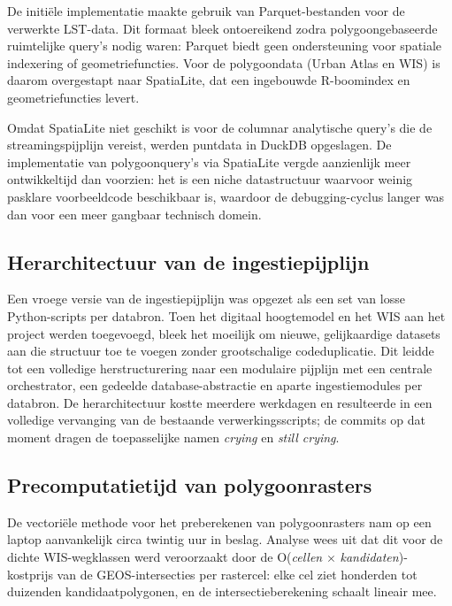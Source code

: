 De initiële implementatie maakte gebruik van Parquet-bestanden voor de verwerkte LST-data.
Dit formaat bleek ontoereikend zodra polygoongebaseerde ruimtelijke query's nodig waren: Parquet biedt geen ondersteuning voor spatiale indexering of geometriefuncties.
Voor de polygoondata (Urban Atlas en WIS) is daarom overgestapt naar SpatiaLite, dat een ingebouwde R-boomindex en geometriefuncties levert.

Omdat SpatiaLite niet geschikt is voor de columnar analytische query's die de streamingspijplijn vereist, werden puntdata in DuckDB opgeslagen.
De implementatie van polygoonquery's via SpatiaLite vergde aanzienlijk meer ontwikkeltijd dan voorzien: het is een niche datastructuur waarvoor weinig pasklare voorbeeldcode beschikbaar is, waardoor de debugging-cyclus langer was dan voor een meer gangbaar technisch domein.

\subsection{Herarchitectuur van de ingestiepijplijn}

Een vroege versie van de ingestiepijplijn was opgezet als een set van losse Python-scripts per databron.
Toen het digitaal hoogtemodel en het WIS aan het project werden toegevoegd, bleek het moeilijk om nieuwe, gelijkaardige datasets aan die structuur toe te voegen zonder grootschalige codeduplicatie.
Dit leidde tot een volledige herstructurering naar een modulaire pijplijn met een centrale orchestrator, een gedeelde database-abstractie en aparte ingestiemodules per databron.
De herarchitectuur kostte meerdere werkdagen en resulteerde in een volledige vervanging van de bestaande verwerkingsscripts; de commits op dat moment dragen de toepasselijke namen \textit{crying} en \textit{still crying}.

\subsection{Precomputatietijd van polygoonrasters}

De vectoriële methode voor het preberekenen van polygoonrasters nam op een laptop aanvankelijk circa twintig uur in beslag.
Analyse wees uit dat dit voor de dichte WIS-wegklassen werd veroorzaakt door de O(\textit{cellen} $\times$ \textit{kandidaten})-kostprijs van de GEOS-intersecties per rastercel: elke cel ziet honderden tot duizenden kandidaatpolygonen, en de intersectieberekening schaalt lineair mee.

